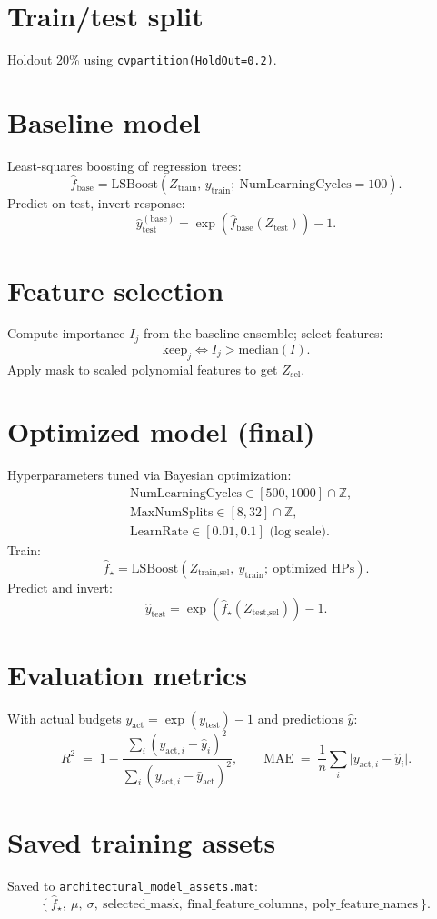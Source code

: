 \documentclass[11pt]{article}
\begin{document}
\section*{Train/test split}
Holdout 20\% using \texttt{cvpartition(HoldOut=0.2)}.

\section*{Baseline model}
Least-squares boosting of regression trees:
\[
\hat{f}_{\text{base}} = \mathrm{LSBoost}(Z_{\text{train}},\, y_{\text{train}};\ \text{NumLearningCycles}=100).
\]
Predict on test, invert response:
\[
\hat{y}_{\text{test}}^{(\text{base})} = \exp(\hat{f}_{\text{base}}(Z_{\text{test}})) - 1.
\]

\section*{Feature selection}
Compute importance $I_j$ from the baseline ensemble; select features:
\[
\text{keep}_j \iff I_j > \mathrm{median}(I).
\]
Apply mask to scaled polynomial features to get $Z_{\text{sel}}$.

\section*{Optimized model (final)}
Hyperparameters tuned via Bayesian optimization:
\[
\begin{aligned}
&\text{NumLearningCycles}\in[500,1000]\cap\mathbb{Z},\\
&\text{MaxNumSplits}\in[8,32]\cap\mathbb{Z},\\
&\text{LearnRate}\in[0.01,0.1] \text{ (log scale)}.
\end{aligned}
\]
Train:
\[
\hat{f}_{\star} = \mathrm{LSBoost}(Z_{\text{train,sel}},\ y_{\text{train}};\ \text{optimized HPs}).
\]
Predict and invert:
\[
\hat{y}_{\text{test}} = \exp(\hat{f}_{\star}(Z_{\text{test,sel}})) - 1.
\]

\section*{Evaluation metrics}
With actual budgets $y_{\text{act}}=\exp(y_{\text{test}})-1$ and predictions $\hat{y}$:
\[
R^2 \;=\; 1 - \frac{\sum_i (y_{\text{act},i}-\hat{y}_i)^2}{\sum_i (y_{\text{act},i}-\bar{y}_{\text{act}})^2},
\qquad
\mathrm{MAE} \;=\; \frac{1}{n}\sum_i \lvert y_{\text{act},i}-\hat{y}_i\rvert.
\]

\section*{Saved training assets}
Saved to \texttt{architectural\_model\_assets.mat}:
\[
\{\ \hat{f}_{\star},\ \mu,\ \sigma,\ \text{selected\_mask},\ \text{final\_feature\_columns},\ \text{poly\_feature\_names}\ \}.
\]
\end{document}
